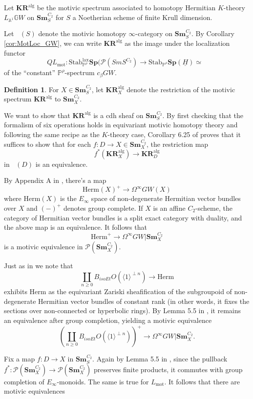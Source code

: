 \documentclass[edeposit,fullpage]{uiucthesis2009}
\newcommand{\mbb}{\mathbb}
\newcommand{\mc}{\mathcal}
\newcommand{\Sm}[1]{\mathbf{Sm}_{#1}}
\newcommand{\Sp}{\mathbf{Sp}}
\newcommand{\KR}{\mathbf{KR}^{\mathrm{alg}}}
\DeclareMathOperator{\SH}{\underline{SH}}
\DeclareMathOperator{\HH}{\underline{H}}
\theoremstyle{plain}
\numberwithin{lemma}{section}
\theoremstyle{definition}
\newtheorem{definition}[lemma]{Definition}
\begin{document}
Let $\KR$ be the motivic spectrum associated to homotopy
Hermitian $K$-theory $L_{\mbb A^1}\mbb GW$ on $\Sm{S}^{C_2}$ for $S$ a
Noetherian scheme of finite Krull dimension. 

Let $\HH(S)$ denote the motivic homotopy $\infty$-category on
$\Sm{S}^{C_2}$. By Corollary \ref{cor:MotLoc_GW}, we can write $\KR$ as the image under the localization functor
\[
QL_{\mathrm{mot}} : \mathrm{Stab}^{\mathrm{lax}}_{\mbb P^\rho} \Sp(\mc
P(Sm{S}^{C_2}) \rightarrow \mathrm{Stab}_{\mbb P^\rho} \Sp(\underline
H) \simeq \SH
\]
of the ``constant'' $\mbb P^\rho$-spectrum $c_{\beta}GW$.

\begin{definition}
For $X \in \Sm{S}^{C_2}$, let $\KR_X$ denote the restriction of the
motivic spectrum $\KR$ to $\Sm{X}^{C_2}$.
\end{definition}

We want to show that $\KR$ is a cdh sheaf on $\Sm{S}^{C_2}$. By first
checking that the formalism of six operations holds in equivariant
motivic homotopy theory and following the same recipe as the
$K$-theory case, Corollary 6.25 of \cite{HoyoisSixOp} proves that it suffices to show that for
each $f : D \rightarrow X \in \Sm{X}^{C_2}$, the restriction map
\[
f^*(\KR_X) \rightarrow \KR_D
\]
in $\SH(D)$ is an equivalence. 

By Appendix A in \cite{Schder}, there's a map 
\[
\mathrm{Herm}(X)^+ \rightarrow \Omega^\infty GW(X)
\]
where $\mathrm{Herm}(X)$ is the $E_\infty$ space of non-degenerate Hermitian vector
bundles over $X$ and $(-)^+$ denotes group complete. If $X$ is an
affine $C_2$-scheme, the category of Hermitian vector bundles is a
split exact category with duality, and the above map is an
equivalence. It follows that
\[
\mathrm{Herm}^+ \rightarrow \Omega^\infty GW|\Sm{X}^{C_2}
\]
is a motivic equivalence in $\mc P(\Sm{X}^{C_2})$. 

Just as in \cite{cdhdesc} we note that
\[
\coprod_{n \geq 0} B_{isoEt}O(\langle 1 \rangle^{\perp n}) \rightarrow \mathrm{Herm}
\]
exhibits $\mathrm{Herm}$ as the equivariant Zariski sheafification of
the subgroupoid of non-degenerate Hermitian vector bundles of constant
rank (in other words, it fixes the sections over non-connected or
hyperbolic rings). By Lemma 5.5 in \cite{cdhdesc}, it remains an
equivalence after group completion, yielding a motivic equivalence
\[
\left(\coprod_{n \geq 0} B_{isoEt}O(\langle 1 \rangle^{\perp
    n})\right)^+ \rightarrow \Omega^\infty GW|\Sm{X}^{C_2}.
\]

Fix a map $f : D \rightarrow X$ in $\Sm{S}^{C_2}$. Again by Lemma 5.5
in \cite{cdhdesc}, since the pullback $f^* : \mc P(\Sm{X}^{C_2})
\rightarrow \mc P(\Sm{X}^{C_2})$ preserves finite products, it
commutes with group completion of $E_\infty$-monoids. The same is true
for $L_{\mathrm{mot}}$. It follows that there are motivic equivalences
\end{document}
